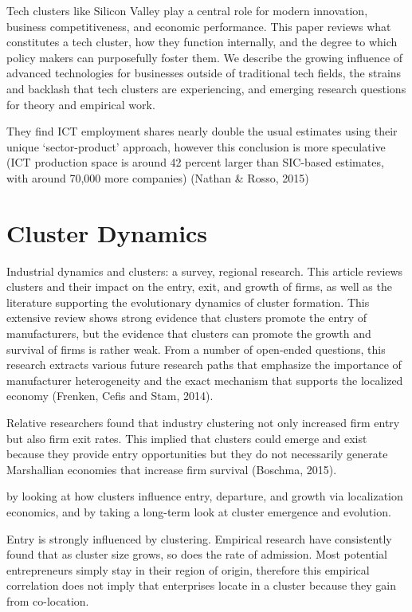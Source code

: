 \documentclass[
  12pt,
  oneside]{book}
\begin{document}
Tech clusters like Silicon Valley play a central role for modern innovation, business competitiveness, and economic performance. This paper reviews what constitutes a tech cluster, how they function internally, and the degree to which policy makers can purposefully foster them. We describe the growing influence of advanced technologies for businesses outside of traditional tech fields, the strains and backlash that tech clusters are experiencing, and emerging research questions for theory and empirical work.

They find ICT employment shares nearly double the usual estimates using their unique `sector-product' approach, however this conclusion is more speculative (ICT production space is around 42 percent larger than SIC-based estimates, with around 70,000 more companies)
(Nathan \& Rosso, 2015)

\hypertarget{cluster-dynamics}{%
\section{Cluster Dynamics}\label{cluster-dynamics}}

Industrial dynamics and clusters: a survey, regional research. This article reviews clusters and their impact on the entry, exit, and growth of firms, as well as the literature supporting the evolutionary dynamics of cluster formation. This extensive review shows strong evidence that clusters promote the entry of manufacturers, but the evidence that clusters can promote the growth and survival of firms is rather weak. From a number of open-ended questions, this research extracts various future research paths that emphasize the importance of manufacturer heterogeneity and the exact mechanism that supports the localized economy (Frenken, Cefis and Stam, 2014).

Relative researchers found that industry clustering not only increased firm entry but also firm exit rates. This implied that clusters could emerge and exist because they provide entry opportunities but they do not necessarily generate Marshallian economies that increase firm survival (Boschma, 2015).

by looking at how clusters influence entry, departure, and growth via localization economics, and by taking a long-term look at cluster emergence and evolution.

Entry is strongly influenced by clustering. Empirical research have consistently found that as cluster size grows, so does the rate of admission. Most potential entrepreneurs simply stay in their region of origin, therefore this empirical correlation does not imply that enterprises locate in a cluster because they gain from co-location.
\end{document}
